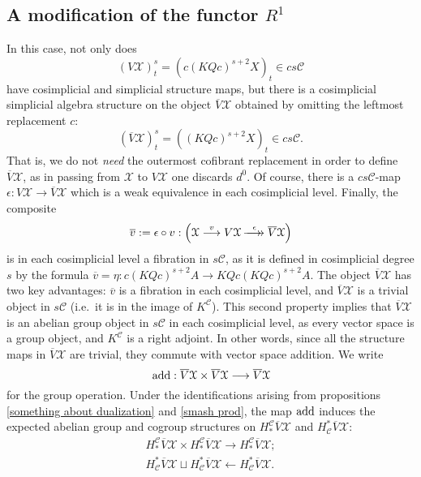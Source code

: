 \documentclass[11pt]{amsart} \renewcommand{\baselinestretch}{1.4}
\theoremstyle{plain}
\theoremstyle{definition}
\renewcommand{\to}{\longrightarrow}
\newcommand{\from}{\longleftarrow}
\newcommand{\calx}{\mathcal{X}}
\newcommand{\calc}{\mathcal{C}}
\newcommand{\epi}{{\,\makebox[0cm][l]{\ensuremath\to}\to{}}}
\newcommand{\Dendo}{R}
\begin{document}
\begin{Operations on the Bousfield-Kan spectral sequence}
\subsection{A modification of the functor $\Dendo^1$}
In this case, not only does
\[(V\calx)^s_t=(c(KQc)^{s+2}X)_t\in cs\calc\]
have cosimplicial and simplicial structure maps,
but there is a cosimplicial simplicial algebra structure on the object $\overline{V}\calx$ obtained by omitting the leftmost replacement $c$:
\[(\overline{V}\calx)^s_t=((KQc)^{s+2}X)_t\in cs\calc.\]
That is, we do not \emph{need} the outermost cofibrant replacement in order to define $\overline{V}\calx$, as in passing from $\calx$ to $V\calx$ one discards $d^0$. Of course, there is a $cs\calc$-map $\epsilon:V\calx \to \overline{V}\calx $ which is a weak equivalence in each cosimplicial level. Finally, the composite
\[\overline{v}:=\epsilon\circ v:\left(\calx\overset{v}{\to}V\calx\overset{\epsilon}{\epi} \overline{V}\calx\right)\]
is in each cosimplicial level a fibration in $s\calc$, as it is defined in cosimplicial degree $s$ by the formula $\overline{v}=\eta:c(KQc)^{s+2}A\to KQc(KQc)^{s+2}A$. The object $\overline{V}\calx$ has two key advantages: $\overline{v}$ is a fibration in each cosimplicial level, and $\overline{V}\calx$ is a trivial object in $s\calc$ (i.e.\ it is in the image of $K^{\calc}$). This second property implies that  $\overline{V}\calx$ is an abelian group object in $s\calc$ in each cosimplicial level, as every vector space is a group object, and $K^{\calc}$ is a right adjoint. In other words, since all the structure maps in $\overline{V}\calx$ are trivial, they commute  with vector space addition. We write
\[\textup{add}:\overline{V}\calx\times \overline{V}\calx\to \overline{V}\calx\]
for the group operation. Under the identifications arising from propositions \ref{something about dualization} and \ref{smash prod}, the map $\textup{add}$ induces the expected abelian group and cogroup structures on $H_*^\calc\overline{V}\calx$ and $H^*_\calc\overline{V}\calx$:
\begin{gather*}
H_*^\calc\overline{V}\calx\times H_*^\calc\overline{V}\calx\to H_*^\calc\overline{V}\calx;\\
H^*_\calc\overline{V}\calx\sqcup H^*_\calc\overline{V}\calx\from H^*_\calc\overline{V}\calx.
\end{gather*}


\end{Operations on the Bousfield-Kan spectral sequence}
\end{document}
